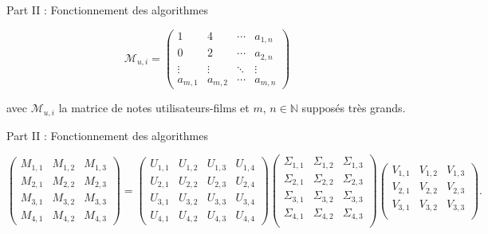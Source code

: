 \begin{frame}{Part II : Fonctionnement des algorithmes}

    $$\mathcal{M}_{u, i} =
        \begin{pmatrix}
            1        & 4        & \cdots{} & a_{1, n} \\
            0        & 2        & \cdots{} & a_{2, n} \\
            \vdots{} & \vdots{} & \ddots{} & \vdots{} \\
            a_{m, 1} & a_{m, 2} & \cdots{} & a_{m, n}
        \end{pmatrix}
    $$

    avec $\mathcal{M}_{u, i}$ la matrice de notes utilisateurs-films et $m$, $n \in \mathbb{N}$ supposés très grands.

\end{frame}

\begin{frame}{Part II : Fonctionnement des algorithmes}

    \begin{equation*}
        \begin{pmatrix}
            M_{1, 1} & M_{1, 2} & M_{1, 3} \\
            M_{2, 1} & M_{2, 2} & M_{2, 3} \\
            M_{3, 1} & M_{3, 2} & M_{3, 3} \\
            M_{4, 1} & M_{4, 2} & M_{4, 3}
        \end{pmatrix}
        =
        \begin{pmatrix}
            U_{1, 1} & U_{1, 2} & U_{1, 3} & U_{1, 4} \\
            U_{2, 1} & U_{2, 2} & U_{2, 3} & U_{2, 4} \\
            U_{3, 1} & U_{3, 2} & U_{3, 3} & U_{3, 4} \\
            U_{4, 1} & U_{4, 2} & U_{4, 3} & U_{4, 4}
        \end{pmatrix}
        \begin{pmatrix}
            \Sigma_{1, 1} & \Sigma_{1, 2} & \Sigma_{1, 3} \\
            \Sigma_{2, 1} & \Sigma_{2, 2} & \Sigma_{2, 3} \\
            \Sigma_{3, 1} & \Sigma_{3, 2} & \Sigma_{3, 3} \\
            \Sigma_{4, 1} & \Sigma_{4, 2} & \Sigma_{4, 3} \\
        \end{pmatrix}
        \begin{pmatrix}
            V_{1, 1} & V_{1, 2} & V_{1, 3} \\
            V_{2, 1} & V_{2, 2} & V_{2, 3} \\
            V_{3, 1} & V_{3, 2} & V_{3, 3} \\
        \end{pmatrix}
        .
    \end{equation*}

\end{frame}
